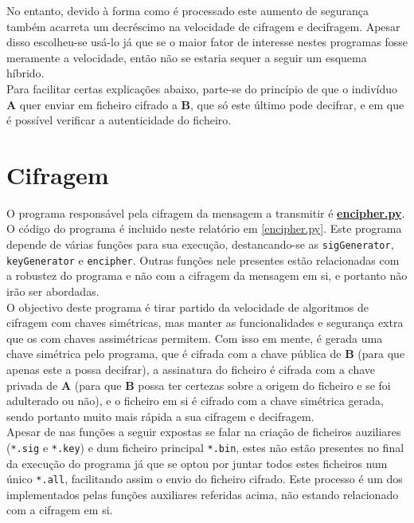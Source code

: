 \documentclass[a4paper,11pt,openright,oneside]{report}
\begin{document}
No entanto, devido à forma como é processado este aumento de segurança também acarreta um decréscimo na velocidade de cifragem e decifragem. Apesar disso escolheu-se usá-lo já que se o maior fator de interesse nestes programas fosse meramente a velocidade, então não se estaria sequer a seguir um esquema híbrido.\\

Para facilitar certas explicações abaixo, parte-se do princípio de que o indivíduo \textbf{A} quer enviar em ficheiro cifrado a \textbf{B}, que só este último pode decifrar, e em que é possível verificar a autenticidade do ficheiro.

\section{Cifragem}

O programa responsável pela cifragem da mensagem a transmitir é \href{run:../Python/Sender/encipher.py}{\textbf{encipher.py}}. O código do programa é incluido neste relatório em \ref{encipher.py}.
Este programa depende de várias funções para sua execução, destancando-se as \verb|sigGenerator|, \verb|keyGenerator| e \verb|encipher|. Outras funções nele presentes estão relacionadas com a robustez do programa e não com a cifragem da mensagem em si, e portanto não irão ser abordadas.\\

O objectivo deste programa é tirar partido da velocidade de algoritmos de cifragem com chaves simétricas, mas manter as funcionalidades e segurança extra que os com chaves assimétricas permitem. Com isso em mente, é gerada uma chave simétrica pelo programa, que é cifrada com a chave pública de \textbf{B} (para que apenas este a possa decifrar), a assinatura do ficheiro é cifrada com a chave privada de \textbf{A} (para que \textbf{B} possa ter certezas sobre a origem do ficheiro e se foi adulterado ou não), e o ficheiro em si é cifrado com a chave simétrica gerada, sendo portanto muito mais rápida a sua cifragem e decifragem.\\

Apesar de nas funções a seguir expostas se falar na criação de ficheiros auziliares (\verb|*.sig| e \verb|*.key|) e dum ficheiro principal \verb|*.bin|, estes não estão presentes no final da execução do programa já que se optou por juntar todos estes ficheiros num único \verb|*.all|, facilitando assim o envio do ficheiro cifrado. Este processo é um dos implementados pelas funções auxiliares referidas acima, não estando relacionado com a cifragem em si.
\end{document}
